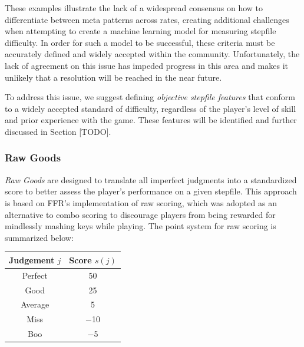 \begin{center}
\begin{table}[ht]
\begin{minipage}{.5\linewidth}
			\medskip
			\vspace{52.5pt}
			\captionsetup{width=0.75\linewidth}
			\label{example-jacks}
		\end{minipage}
	\end{table}
\end{center}


\vspace{-7.75mm }

These examples illustrate the lack of a widespread consensus on how to differentiate between meta patterns across rates, creating additional challenges when attempting to create a machine learning model for measuring stepfile difficulty. In order for such a model to be successful, these criteria must be accurately defined and widely accepted within the community. Unfortunately, the lack of agreement on this issue has impeded progress in this area and makes it unlikely that a resolution will be reached in the near future.

\vspace{2mm}

To address this issue, we suggest defining \textit{objective stepfile features} that conform to a widely accepted standard of difficulty, regardless of the player's level of skill and prior experience with the game. These features will be identified and further discussed in Section [TODO].

\subsubsection{Raw Goods}

\textit{Raw Goods} are designed to translate all imperfect judgments into a standardized score to better assess the player's performance on a given stepfile. This approach is based on FFR's implementation of raw scoring, which was adopted as an alternative to combo scoring to discourage players from being rewarded for mindlessly mashing keys while playing. The point system for raw scoring is summarized below:

\begin{center}
	\begin{tabular}{c@{\hskip 10mm}c}
		\hspace{5mm} \textbf{Judgement} $j$ \hspace{5mm} & \textbf{Score} $s(j)$ \\
		\hline
		
		Perfect                               & 50                    \\
		Good                                  & 25                    \\
		Average                               & 5                     \\
		Miss                                  & $-$10                 \\
		Boo                                   & $-$5                  \\
	\end{tabular}
\end{center}

